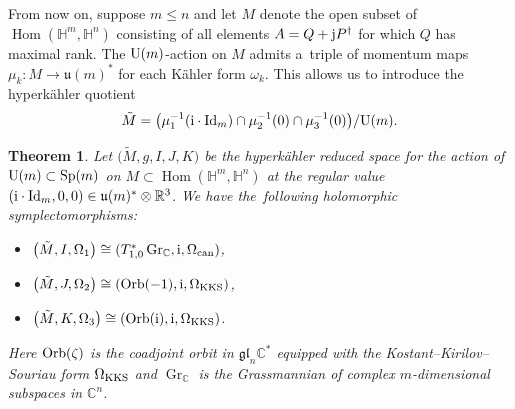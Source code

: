 \documentclass[pdftex]{sigma}
\numberwithin{equation}{section}
\newtheorem{Theorem}{Theorem}[section]
\DeclareMathOperator{\Hom}{Hom}
\DeclareMathOperator{\Gr}{Gr}
\newcommand{\R}{\mathbb{R}}
\newcommand{\C}{\mathbb{C}}
\newcommand{\Q}{\mathbb{H}}
\newcommand{\Id}{{\rm Id}}
\begin{document}
From now on, suppose $m\le n$ and let $M$ denote the open subset of $\Hom(\Q^m,\Q^n)$ consisting of all elements $A=Q+{\rm j}P^\dagger$ for which $Q$ has maximal rank. The ${\rm U}(m)$-action on $M$ admits a~triple of momentum maps $\mu_k\colon M\rightarrow\mathfrak{u}(m)^*$ for each K\"{a}hler form $\omega_k$. This allows us to introduce the hyperk\"{a}hler quotient
\[
\tilde{M}=\bigl(\mu_1^{-1}({\rm i}\cdot\Id_m)\cap\mu_2^{-1}(0)\cap\mu_3^{-1}(0)\bigr)/{\rm U}(m).
\]
\begin{Theorem}\label{HK_red_thm}
	Let $\bigl(\tilde{M},g,I,J,K\bigr)$ be the hyperk\"{a}hler reduced space for the action of ${\rm U}(m)\subset {\rm Sp}(m)$ on $M\subset\Hom(\Q^m,\Q^n)$ at the regular value $({\rm i}\cdot\Id_m,0,0)\in\mathfrak{u}(m)^*\otimes\R^3$. We have the~following holomorphic symplectomorphisms:
	\begin{itemize}\itemsep=0pt
		\item $\bigl(\tilde{M}, I, \Omega_1\bigr)\cong (T^*_{1,0}\Gr_\C, {\rm i}, \Omega_{\rm can})$,
		\item $\bigl(\tilde{M},J,\Omega_2\bigr)\cong({\rm Orb}(-1), {\rm i}, \Omega_{\rm KKS})$,
		\item $\bigl(\tilde{M},K,\Omega_3\bigr)\cong({\rm Orb}({\rm i}), {\rm i}, \Omega_{\rm KKS})$.
	\end{itemize}
	Here ${\rm Orb}(\zeta)$ is the coadjoint orbit in $\mathfrak{gl}_n\C^*$ equipped with the Kostant--Kirilov--Souriau form $\Omega_{\rm KKS}$ and $\Gr_\C$ is the Grassmannian of complex $m$-dimensional subspaces in $\C^n$.
\end{Theorem}
\end{document}
